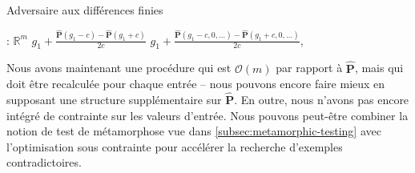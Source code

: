 \begin{algorithm}[H]
\caption{Adversaire aux différences finies}
\label{alg:fd_fuzz}
\begin{algorithmic}[1]
: $\mathbb{R}^m$
 
\State \Return $g_1 + \frac{\mathbf{\hat P}(g_1 - c) - \mathbf{\hat P}(g_1 + c)}{2c}$
\Else {}
\State \Return $g_1 + \frac{\mathbf{\hat P}(g_1 - c, 0, \ldots) - \mathbf{\hat P}(g_1 + c, 0, \ldots)}{2c}$, 
\EndIf
\EndProcedure
\end{algorithmic}
\end{algorithm}

Nous avons maintenant une procédure qui est $\mathcal{O}(m)$ par rapport à $\mathbf{\hat P}$, mais qui doit être recalculée pour chaque entrée -- nous pouvons encore faire mieux en supposant une structure supplémentaire sur $\mathbf{\hat P}$. En outre, nous n'avons pas encore intégré de contrainte sur les valeurs d'entrée. Nous pouvons peut-être combiner la notion de test de métamorphose vue dans \autoref{subsec:metamorphic-testing} avec l'optimisation sous contrainte pour accélérer la recherche d'exemples contradictoires.

